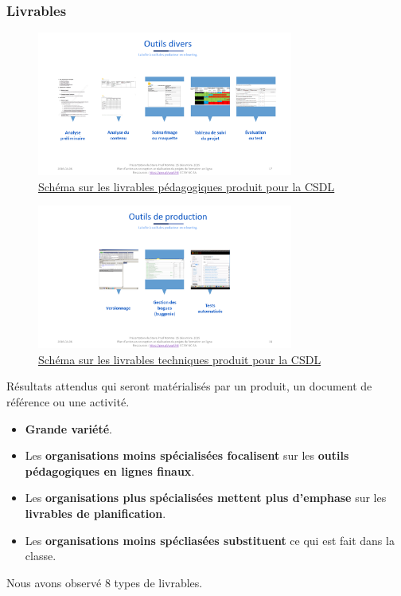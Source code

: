 						\begin{frame}[allowframebreaks]
						\frametitle{Livrables}
						\begin{figure}
                     			\centering
                    			 \includegraphics[width = 0.75\textwidth]{livrables1.png}
                     			\caption{\tiny{\href{run:livrables1.png}{Schéma sur les livrables pédagogiques produit pour la CSDL}}}
                   			\end{figure}
                   			\begin{figure}
                     			\centering
                    			 \includegraphics[width = 0.75\textwidth]{livrables2.png}
                     			\caption{\tiny{\href{run:livrables2.png}{Schéma sur les livrables techniques produit pour la CSDL}}}
                   			\end{figure}
                   			
                        			Résultats attendus qui seront matérialisés par un produit, un document de référence ou une activité.
						\begin{itemize}
							\item \textbf{Grande variété}.
							\item Les \textbf{organisations moins spécialisées focalisent} sur les \textbf{outils pédagogiques en lignes finaux}.
							\item Les \textbf{organisations plus spécialisées mettent plus d'emphase} sur les \textbf{livrables de planification}.
							\item Les \textbf{organisations moins spécliasées substituent} ce qui est fait dans la classe.
						\end{itemize}		
						\framebreak
						Nous avons observé 8 types de livrables.
						
						
					\end{frame}

